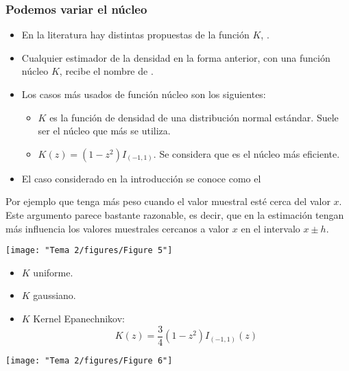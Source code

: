 \subsubsection{Podemos variar el núcleo}
\begin{tcolorbox}[colback=blue!5!white, colframe=blue!75!black, title=\textbf{Función núcleo}]
\begin{itemize}[label=\textbullet]
    \item En la literatura hay distintas propuestas de la función $K$, .
    \item Cualquier estimador de la densidad en la forma anterior, con una función núcleo $K$, recibe el nombre de .
    \item Los casos más usados de función núcleo son los siguientes:
        \begin{itemize}[label=\textrightarrow]
            \item {} $K$ es la función de densidad de una distribución normal estándar. Suele ser el núcleo que más se utiliza.
            \item {} $K(z)=(1-z^2)I_{(-1,1)}$. Se considera que es el núcleo más eficiente.
        \end{itemize}
    \item El caso considerado en la introducción se conoce como el  
\end{itemize}
\end{tcolorbox}
Por ejemplo que tenga más peso cuando el valor muestral esté cerca del valor $x$. Este argumento parece bastante razonable, es decir, que en la estimación tengan más influencia los valores muestrales cercanos a valor $x$ en el intervalo $x\pm h$. 

\begin{center}
\texttt{[image: "Tema 2/figures/Figure 5"]}
\end{center}
\begin{itemize}[label=\textbullet]
    \item $K$ uniforme.
    \item $K$ gaussiano.
    \item $K$ Kernel Epanechnikov: \[
    K(z)=\dfrac{3}{4}(1-z^2)I_{(-1,1)}(z)
    \]  
\end{itemize}
\vspace{1cm}
\begin{center}
    \texttt{[image: "Tema 2/figures/Figure 6"]}
\end{center}
